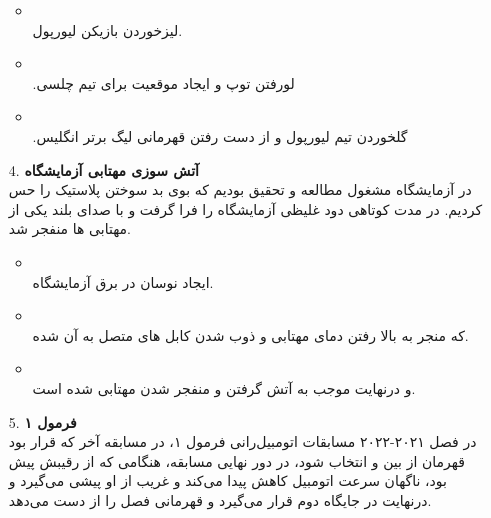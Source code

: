 \begin{qsolve}[]
	\begin{enumerate}
		\item [ ]
		\begin{itemize}
			\item {}\\
			لیزخوردن بازیکن لیورپول.
			
			\item {}\\
			‫لو‬‫رفتن‬ ‫توپ‬ ‫و‬ ‫ایجاد‬ ‫موقعیت‬ ‫برای‬ ‫تیم‬ ‫چلسی‪.‬‬
			
			\item {}\\
			‫گل‫خوردن‬ ‫تیم‬ ‫لیورپول‬ ‫و‬ ‫از‬ ‫دست‬ ‫رفتن‬ ‫قهرمانی‬ ‫لیگ‬ ‫برتر‬ ‫انگلیس‪.‬‬
		\end{itemize}
		
		
		
		
		\item [4.]
		\textbf{آتش سوزی مهتابی آزمایشگاه}\\
		در آزمایشگاه مشغول مطالعه و تحقیق بودیم که بوی بد سوختن پلاستیک را حس کردیم. در مدت کوتاهی دود غلیظی آزمایشگاه را فرا گرفت و با صدای بلند یکی از مهتابی ها منفجر شد.
		
		\begin{itemize}
			\item {}\\
			ایجاد نوسان در برق آزمایشگاه.
			
			\item {}\\
			که منجر به بالا رفتن دمای مهتابی و ذوب شدن کابل های متصل به آن شده.
			
			\item {}\\
			و درنهایت موجب به آتش گرفتن و منفجر شدن مهتابی شده است.
		\end{itemize}
		
		
		
		\item [5.]
		\textbf{فرمول ۱}\\
		در فصل ۲۰۲۱-۲۰۲۲ مسابقات اتومبیل‌رانی فرمول ۱، در مسابقه آخر که قرار بود قهرمان از بین  و  انتخاب شود، در دور نهایی مسابقه، هنگامی که  از رقیبش پیش بود، ناگهان سرعت اتومبیل کاهش پیدا می‌کند و غریب از او پیشی می‌گیرد و درنهایت  در جایگاه دوم قرار می‌گیرد و قهرمانی فصل را از دست می‌دهد.
		

\end{enumerate}
\end{qsolve}
